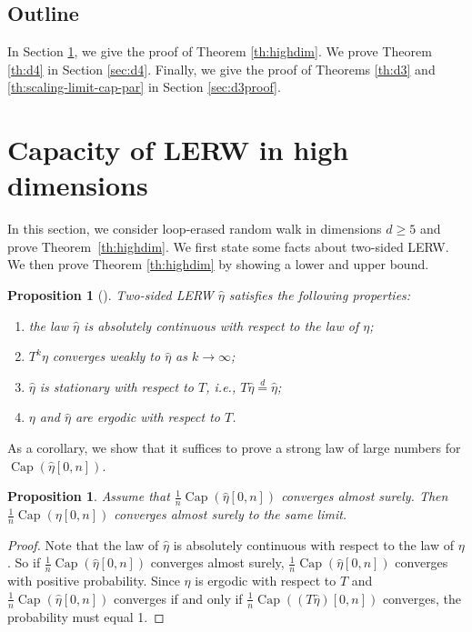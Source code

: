 \documentclass{article}
\DeclareMathOperator{\Ca}{Cap}
\newcommand{\1}{\mathbf{1}}
\newcommand{\heta}{\hat\eta}
\newtheorem{proposition}[theorem]{Proposition}
\theoremstyle{definition}
\numberwithin{equation}{section}
\numberwithin{theorem}{section}
\begin{document}
\subsection{Outline}\label{sec:outline-lerw}
In Section \ref{sec:highdim}, we give the proof of Theorem \ref{th:highdim}. We prove Theorem \ref{th:d4} in Section \ref{sec:d4}. Finally, we give the proof of Theorems \ref{th:d3} and \ref{th:scaling-limit-cap-par} in Section \ref{sec:d3proof}.


\section{Capacity of LERW in high dimensions}\label{sec:highdim}
In this section, we consider loop-erased random walk in dimensions $d\geq5$ and prove Theorem~\ref{th:highdim}. We first state some facts about two-sided LERW. We then prove Theorem \ref{th:highdim} by showing a lower and upper bound.
\begin{proposition}[\cite{lawler80selfavoiding}]
Two-sided LERW $\heta$ satisfies the following properties:
\begin{enumerate}
	\item the law $\heta$ is absolutely continuous with respect to the law of $\eta$;
	\item $T^k\eta$ converges weakly to $\heta$ as $k\rightarrow\infty$;
	\item $\heta$ is stationary with respect to $T$, i.e., $T\heta\stackrel{d}{=}\heta$;
	\item $\eta$ and $\heta$ are ergodic with respect to $T$.
\end{enumerate}
\end{proposition}
As a corollary, we show that it suffices to prove a strong law of large numbers for $\Ca(\heta[0,n])$.
\begin{proposition}\label{prop:reductiontwosided}
Assume that $\frac{1}{n}\Ca(\heta[0,n])$ converges almost surely. Then $\frac{1}{n}\Ca(\eta[0,n])$ converges almost surely to the same limit.
\end{proposition}
\begin{proof}
Note that the law of $\heta$ is absolutely continuous with respect to the law of $\eta$. So if $\frac{1}{n}\Ca(\heta[0,n])$ converges almost surely, $\frac{1}{n}\Ca(\heta[0,n])$ converges with positive probability. Since $\eta$ is ergodic with respect to $T$ and $\frac{1}{n}\Ca(\heta[0,n])$ converges if and only if $\frac{1}{n}\Ca((T\heta)[0,n])$ converges, the probability must equal 1.
\end{proof}
\end{document}

